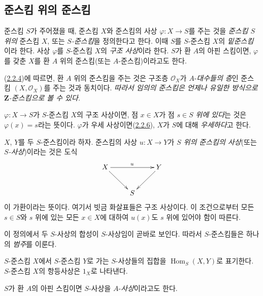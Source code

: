 \subsection{준스킴 위의 준스킴}
\label{subsection:I.2.5-ko}

\begin{definition}[2.5.1]
\label{I.2.5.1-ko}
준스킴 $S$가 주어졌을 때, 준스킴 $X$와 준스킴의 사상
$\varphi:X\to S$를 주는 것을
\emph{준스킴 $S$ 위의} 준스킴 $X$, 또는 \emph{$S$-준스킴}을
정의한다고 한다. 이때 $S$를 $S$-준스킴 $X$의 \emph{밑준스킴}이라
한다. 사상 $\varphi$를 $S$-준스킴 $X$의 \emph{구조 사상}이라 한다.
$S$가 환 $A$의 아핀 스킴이면, $\varphi$를 갖춘 $X$를 환 $A$ 위의
준스킴(또는 $A$-준스킴)이라고도 한다.
\end{definition}

(\hyperref[I.2.2.4-ko]{2.2.4})에 따르면, 환 $A$ 위의 준스킴을 주는
것은 구조층 $\mathscr{O}_X$가 $A$-\emph{대수들의 층}인 준스킴
$(X,\mathscr{O}_X)$를 주는 것과 동치이다. \emph{따라서 임의의
준스킴은 언제나 유일한 방식으로 $\mathbf{Z}$-준스킴으로 볼 수 있다.}

$\varphi:X\to S$가 $S$-준스킴 $X$의 구조 사상이면, 점 $x\in X$가
점 $s\in S$ \emph{위에 있다}는 것은 $\varphi(x)=s$라는 뜻이다.
$\varphi$가 우세 사상이면(\hyperref[I.2.2.6-ko]{2.2.6}), $X$가
$S$에 대해 \emph{우세하다}고 한다.

\begin{env}[2.5.2]
\label{I.2.5.2-ko}
$X$, $Y$를 두 $S$-준스킴이라 하자. 준스킴의 사상 $u:X\to Y$가
\emph{$S$ 위의 준스킴의 사상}(또는 \emph{$S$-사상})이라는 것은 도식
\label{I.2.5.2.diagram-ko}
\[
  \xymatrix{
    X\ar[rr]^u\ar[dr] & & Y\ar[dl]\\
    & S &
  }
\]
이 가환이라는 뜻이다. 여기서 빗금 화살표들은 구조 사상이다. 이
조건으로부터 모든 $s\in S$와 $s$ 위에 있는 모든 $x\in X$에 대하여
$u(x)$도 $s$ 위에 있어야 함이 따른다.
\end{env}

이 정의에서 두 $S$-사상의 합성이 $S$-사상임이 곧바로 보인다.
따라서 $S$-준스킴들은 하나의 \emph{범주}를 이룬다.

$S$-준스킴 $X$에서 $S$-준스킴 $Y$로 가는 $S$-사상들의 집합을
$\operatorname{Hom}_S(X,Y)$로 표기한다. $S$-준스킴 $X$의 항등사상은
$1_X$로 나타낸다.

$S$가 환 $A$의 아핀 스킴이면 $S$-사상을 $A$-\emph{사상}이라고도
한다.

